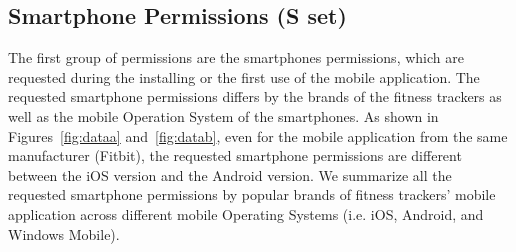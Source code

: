 %		
%		

\subsection{Smartphone Permissions (S set)}
The first group of permissions are the smartphones permissions, which are requested during the installing or the first use of the mobile application. The requested smartphone permissions differs by the brands of the fitness trackers as well as the mobile Operation System of the smartphones. As shown in Figures~\ref{fig:dataa} and~\ref{fig:datab}, even for the mobile application from the same manufacturer (Fitbit), the requested smartphone permissions are different between the iOS version and the Android version. We summarize all the requested smartphone permissions by popular brands of fitness trackers' mobile application across different mobile Operating Systems (i.e. iOS, Android, and Windows Mobile).

